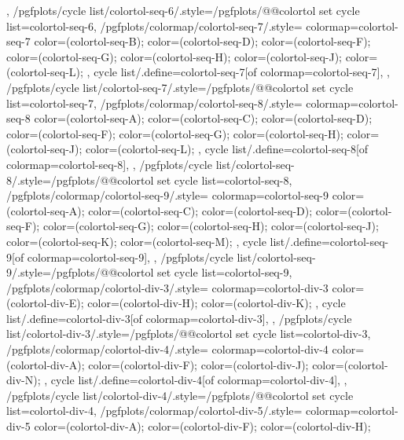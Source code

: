 {{  },
  /pgfplots/cycle list/colortol-seq-6/.style={/pgfplots/@@colortol set cycle list={colortol-seq-6}},
  /pgfplots/colormap/colortol-seq-7/.style={
    colormap={colortol-seq-7}{
      color=(colortol-seq-B);
      color=(colortol-seq-D);
      color=(colortol-seq-F);
      color=(colortol-seq-G);
      color=(colortol-seq-H);
      color=(colortol-seq-J);
      color=(colortol-seq-L);
    },
    cycle list/.define={colortol-seq-7}{[of colormap=colortol-seq-7]},
  },
  /pgfplots/cycle list/colortol-seq-7/.style={/pgfplots/@@colortol set cycle list={colortol-seq-7}},
  /pgfplots/colormap/colortol-seq-8/.style={
    colormap={colortol-seq-8}{
      color=(colortol-seq-A);
      color=(colortol-seq-C);
      color=(colortol-seq-D);
      color=(colortol-seq-F);
      color=(colortol-seq-G);
      color=(colortol-seq-H);
      color=(colortol-seq-J);
      color=(colortol-seq-L);
    },
    cycle list/.define={colortol-seq-8}{[of colormap=colortol-seq-8]},
  },
  /pgfplots/cycle list/colortol-seq-8/.style={/pgfplots/@@colortol set cycle list={colortol-seq-8}},
  /pgfplots/colormap/colortol-seq-9/.style={
    colormap={colortol-seq-9}{
      color=(colortol-seq-A);
      color=(colortol-seq-C);
      color=(colortol-seq-D);
      color=(colortol-seq-F);
      color=(colortol-seq-G);
      color=(colortol-seq-H);
      color=(colortol-seq-J);
      color=(colortol-seq-K);
      color=(colortol-seq-M);
    },
    cycle list/.define={colortol-seq-9}{[of colormap=colortol-seq-9]},
  },
  /pgfplots/cycle list/colortol-seq-9/.style={/pgfplots/@@colortol set cycle list={colortol-seq-9}},
  /pgfplots/colormap/colortol-div-3/.style={
    colormap={colortol-div-3}{
      color=(colortol-div-E);
      color=(colortol-div-H);
      color=(colortol-div-K);
    },
    cycle list/.define={colortol-div-3}{[of colormap=colortol-div-3]},
  },
  /pgfplots/cycle list/colortol-div-3/.style={/pgfplots/@@colortol set cycle list={colortol-div-3}},
  /pgfplots/colormap/colortol-div-4/.style={
    colormap={colortol-div-4}{
      color=(colortol-div-A);
      color=(colortol-div-F);
      color=(colortol-div-J);
      color=(colortol-div-N);
    },
    cycle list/.define={colortol-div-4}{[of colormap=colortol-div-4]},
  },
  /pgfplots/cycle list/colortol-div-4/.style={/pgfplots/@@colortol set cycle list={colortol-div-4}},
  /pgfplots/colormap/colortol-div-5/.style={
    colormap={colortol-div-5}{
      color=(colortol-div-A);
      color=(colortol-div-F);
      color=(colortol-div-H);
}}}
